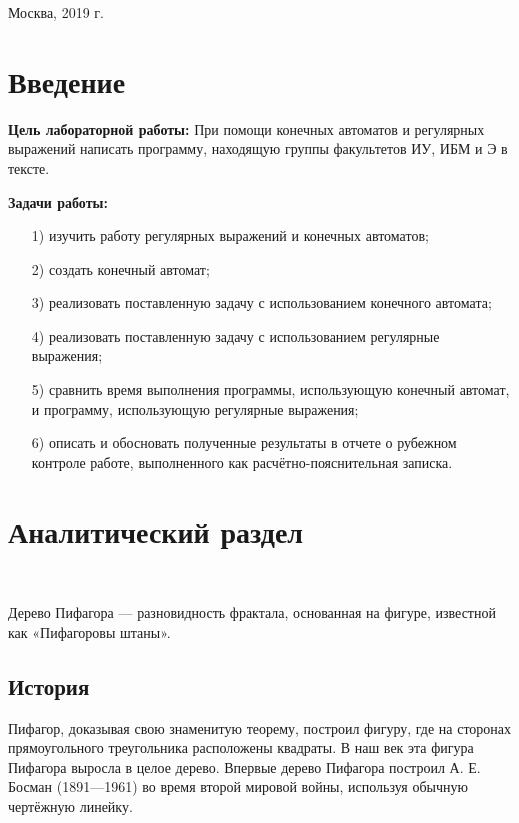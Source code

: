 \documentclass[a4paper,12pt]{article}
\begin{document}
	\vspace*{40mm}
	\begin{center}
		Москва, 2019 г.  
	\end{center}
	\thispagestyle{empty}
	
	\tableofcontents
	
	\section*{Введение}
	
	\textbf{Цель лабораторной работы:} При помощи конечных автоматов и регулярных выражений написать программу, находящую группы факультетов ИУ, ИБМ и Э в тексте.
	
	\textbf{Задачи работы:}
	
	\begin{enumerate} 
		\item[1)] изучить работу регулярных выражений и конечных автоматов;
		\item[2)] создать конечный автомат;
		\item[3)] реализовать поставленную задачу с использованием конечного автомата;
		\item[4)] реализовать поставленную задачу с использованием регулярные выражения;
		\item[5)] сравнить время выполнения программы, использующую конечный автомат, и программу, использующую регулярные выражения;
		\item[6)] описать и обосновать полученные результаты в отчете о рубежном контроле 
		работе, выполненного как расчётно-пояснительная записка. 
	\end{enumerate} 
	\pagebreak
	
	\section{Аналитический раздел}
	
	~\
	
	Дерево Пифагора — разновидность фрактала, основанная на фигуре, известной как «Пифагоровы штаны».
	
	\subsection{История}
	
	Пифагор, доказывая свою знаменитую теорему, построил фигуру, где на сторонах прямоугольного треугольника расположены квадраты. В наш век эта фигура Пифагора выросла в целое дерево. Впервые дерево Пифагора построил А. Е. Босман (1891—1961) во время второй мировой войны, используя обычную чертёжную линейку.
	
\end{document}

